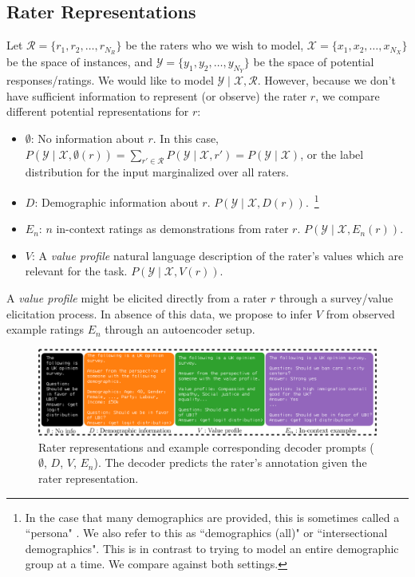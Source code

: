 \documentclass[11pt]{article}
\begin{document}
\subsection{Rater Representations}
Let $\mathcal{R} = \{r_1, r_2, \ldots, r_{N_R}\}$ be the raters who we wish to model, $\mathcal{X} = \{x_1, x_2, \ldots, x_{N_X}\}$ be the space of instances, and $\mathcal{Y} = \{y_1, y_2, \ldots, y_{N_Y}\}$ be the space of potential responses/ratings.
We would like to model 
$\mathcal{Y} \mid \mathcal{X}, \mathcal{R}$.
However, because we don't have sufficient information to represent (or observe) the rater $r$, we compare different potential representations for $r$:
\begin{itemize}
\item $\emptyset$: No information about $r$. In this case, 
$P(\mathcal{Y} \mid \mathcal{X}, \emptyset(r)) = \sum_{r' \in \mathcal{R}} P(\mathcal{Y} \mid \mathcal{X}, r') = P(\mathcal{Y} \mid \mathcal{X})$,
or the label distribution for the input marginalized over all raters.

\item $D$: Demographic information about $r$. $P(\mathcal{Y} \mid \mathcal{X}, D(r))$.~\footnote{In the case that many demographics are provided, this is sometimes called a ``persona" \citep{cheng-etal-2023-marked}. We also refer to this as ``demographics (all)" or ``intersectional demographics". This is in contrast to trying to model an entire demographic group at a time.
We compare against both settings.}

\item $E_n$: $n$ in-context ratings as demonstrations from rater $r$. $P(\mathcal{Y} \mid \mathcal{X}, E_n(r))$.

\item $V$: A {\em value profile} natural language description of the rater's values which are relevant for the task. $P(\mathcal{Y} \mid \mathcal{X}, V(r))$.
\end{itemize}


A {\em value profile} might be elicited directly from a rater $r$ through a survey/value elicitation process.
In absence of this data, we propose to infer $V$ from observed example ratings $E_n$ through an autoencoder setup.

\begin{figure}[t]
\centering
\includegraphics[width=1\textwidth]{files/raterreplarge-cropped.pdf}
\small
\vspace{-13pt}
\caption{Rater representations and example corresponding decoder prompts
($\emptyset$, $D$, $V$, $E_n$).
The decoder predicts the rater's annotation given the rater representation.
}
\label{fig:raterrep}
\vspace{-2pt}
\end{figure}
\end{document}
